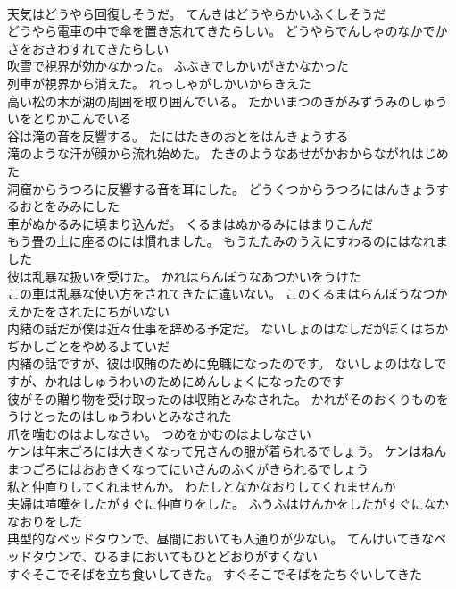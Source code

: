 \documentclass[8pt]{extreport}
\begin{document}
\begin{CJK}{UTF8}{min}
\\	天気はどうやら回復しそうだ。	てんきはどうやらかいふくしそうだ 
\\	どうやら電車の中で傘を置き忘れてきたらしい。	どうやらでんしゃのなかでかさをおきわすれてきたらしい 
\\	吹雪で視界が効かなかった。	ふぶきでしかいがきかなかった 
\\	列車が視界から消えた。	れっしゃがしかいからきえた 
\\	高い松の木が湖の周囲を取り囲んでいる。	たかいまつのきがみずうみのしゅういをとりかこんでいる 
\\	谷は滝の音を反響する。	たにはたきのおとをはんきょうする 
\\	滝のような汗が顔から流れ始めた。	たきのようなあせがかおからながれはじめた 
\\	洞窟からうつろに反響する音を耳にした。	どうくつからうつろにはんきょうするおとをみみにした 
\\	車がぬかるみに填まり込んだ。	くるまはぬかるみにはまりこんだ 
\\	もう畳の上に座るのには慣れました。	もうたたみのうえにすわるのにはなれました 
\\	彼は乱暴な扱いを受けた。	かれはらんぼうなあつかいをうけた 
\\	この車は乱暴な使い方をされてきたに違いない。	このくるまはらんぼうなつかえかたをされたにちがいない 
\\	内緒の話だが僕は近々仕事を辞める予定だ。	ないしょのはなしだがぼくはちかぢかしごとをやめるよていだ 
\\	内緒の話ですが、彼は収賄のために免職になったのです。	ないしょのはなしですが、かれはしゅうわいのためにめんしょくになったのです 
\\	彼がその贈り物を受け取ったのは収賄とみなされた。	かれがそのおくりものをうけとったのはしゅうわいとみなされた 
\\	爪を噛むのはよしなさい。	つめをかむのはよしなさい 
\\	ケンは年末ごろには大きくなって兄さんの服が着られるでしょう。	ケンはねんまつごろにはおおきくなってにいさんのふくがきられるでしょう 
\\	私と仲直りしてくれませんか。	わたしとなかなおりしてくれませんか 
\\	夫婦は喧嘩をしたがすぐに仲直りをした。	ふうふはけんかをしたがすぐになかなおりをした 
\\	典型的なベッドタウンで、昼間においても人通りが少ない。	てんけいてきなベッドタウンで、ひるまにおいてもひとどおりがすくない 
\\	すぐそこでそばを立ち食いしてきた。	すぐそこでそばをたちぐいしてきた 

\end{CJK}
\end{document}
